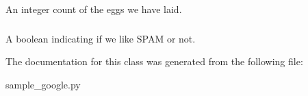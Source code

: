 \-An integer count of the eggs we have laid. 

\hypertarget{classsample__google_1_1SampleClass_af2f150d91cb0a82149140df573e1ff7c}{
\subsubsection[{likes\-\_\-spam}]{}}\label{classsample__google_1_1SampleClass_af2f150d91cb0a82149140df573e1ff7c}


\-A boolean indicating if we like \-S\-P\-A\-M or not. 



\-The documentation for this class was generated from the following file\-:\begin{DoxyCompactItemize}
\item 
sample\-\_\-google.\-py\end{DoxyCompactItemize}
